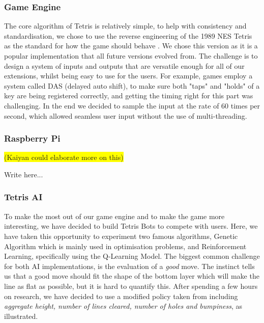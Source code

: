 \documentclass[11pt]{article}
\begin{document}
\subsubsection{Game Engine}
\begin{flushleft}
The core algorithm of Tetris is relatively simple, to help with consistency and standardisation, we chose to use the reverse engineering of the 1989 NES Tetris as the standard for how the game should behave \cite{tetrisreverseengineering}. We chose this version as it is a popular implementation that all future versions evolved from. The challenge is to design a system of inputs and outputs that are versatile enough for all of our extensions, whilst being easy to use for the users. For example, games employ a system called DAS (delayed auto shift), to make sure both "taps" and "holds" of a key are being registered correctly, and getting the timing right for this part was challenging. In the end we decided to sample the input at the rate of 60 times per second, which allowed seamless user input without the use of multi-threading. 
\end{flushleft}

\subsubsection{Raspberry Pi}
\colorbox{yellow}{(Kaiyan could elaborate more on this)}
\begin{flushleft}
Write here...
\end{flushleft}

\subsubsection{Tetris AI}
To make the most out of our game engine and to make the game more interesting, we have decided to build Tetris Bots to compete with users. Here, we have taken this opportunity to experiment two famous algorithms, Genetic Algorithm which is mainly used in optimisation problems, and Reinforcement Learning, specifically using the Q-Learning Model. The biggest common challenge for both AI implementations, is the evaluation of a \textit{good} move. The instinct tells us that a good move should fit the shape of the bottom layer which will make the line as flat as possible, but it is hard to quantify this. After spending a few hours on research, we have decided to use a modified policy taken from \cite{tetrisai} including \textit{aggregate height, number of lines cleared, number of holes and bumpiness}, as illustrated.  
\end{document}
